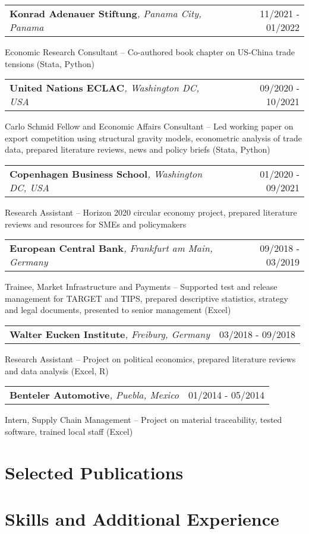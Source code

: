 \documentclass[A4,11pt]{article}
\makeatletter
\newcommand{\Subheading}[4]{   
    \begin{tabular*}{0.97\textwidth}[t]{l@{\extracolsep{\fill}}r}
      \textbf{#1}\textit{\small #2} & \small #3 
      \end{tabular*}
      \small #4 
    \vspace{7pt}}
\makeatother
\begin{document}
    \Subheading
        {Konrad Adenauer Stiftung}{, Panama City, Panama}{11/2021 - 01/2022}
        {Economic Research Consultant -- Co-authored book chapter on US-China trade tensions (Stata, Python)}  


    \Subheading
        {United Nations ECLAC}{, Washington DC, USA}{09/2020 - 10/2021}
        {Carlo Schmid Fellow and Economic Affairs Consultant -- Led working paper on export competition 
        using structural gravity models, econometric analysis of trade data, prepared literature reviews, news and policy briefs (Stata, Python)}

    \Subheading
        {Copenhagen Business School}{, Washington DC, USA}{01/2020 - 09/2021}
        {Research Assistant -- Horizon 2020 circular economy project, prepared literature reviews and 
        resources for SMEs and policymakers}

    \Subheading
        {European Central Bank}{, Frankfurt am Main, Germany}{09/2018 - 03/2019}
        {Trainee, Market Infrastructure and Payments -- Supported test and release management for TARGET 
        and TIPS, prepared descriptive statistics, strategy and legal documents, presented to senior management (Excel)}

    \Subheading
        {Walter Eucken Institute}{, Freiburg, Germany}{03/2018 - 09/2018}
        {Research Assistant -- Project on political economics, prepared literature reviews and data analysis (Excel, R)}

    \Subheading
        {Benteler Automotive}{, Puebla, Mexico}{01/2014 - 05/2014}
        {Intern, Supply Chain Management -- Project on material traceability, tested software, trained local staff (Excel)}

\newpage

\section{Selected Publications}
\setlength{}
\begin{refsection}
\nocite{*}
\printbibliography[heading=none]
\end{refsection}

\section{Skills and Additional Experience}
\end{document}
